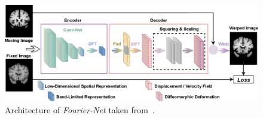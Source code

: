 \documentclass[english,version-2022-01]{uzl-thesis} %
\begin{document}
\begin{figure}[htpb]
	\centering
	\graphicspath{{images/}{\main/images/}}
	\includegraphics[width=\linewidth]{ArchitectureFourier-Net.png} 
	\caption{Architecture of \emph{Fourier-Net} taken from~\cite{Fourier-Net}.}
	\label{fig:Fourier-Net}
\end{figure}
\end{document}
